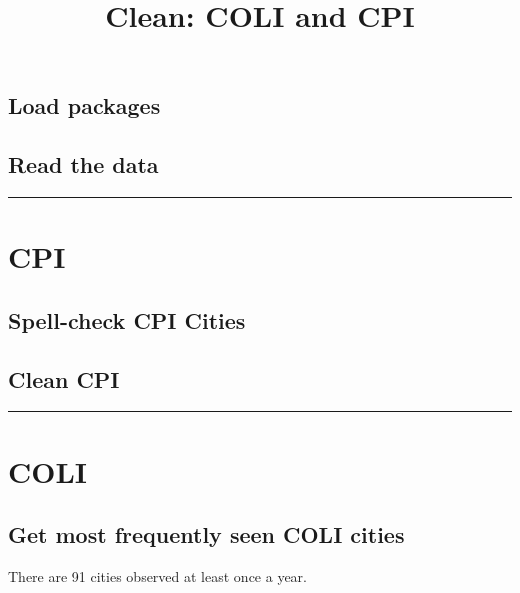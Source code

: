 \documentclass[]{article}
\title{Clean: COLI and CPI}
\author{}
\date{}
\begin{document}
\maketitle

\hypertarget{load-packages}{%
\subsection{Load packages}\label{load-packages}}

\hypertarget{read-the-data}{%
\subsection{Read the data}\label{read-the-data}}

\begin{center}\rule{0.5\linewidth}{\linethickness}\end{center}

\hypertarget{cpi}{%
\section{CPI}\label{cpi}}

\hypertarget{spell-check-cpi-cities}{%
\subsection{Spell-check CPI Cities}\label{spell-check-cpi-cities}}

\hypertarget{clean-cpi}{%
\subsection{Clean CPI}\label{clean-cpi}}

\begin{center}\rule{0.5\linewidth}{\linethickness}\end{center}

\hypertarget{coli}{%
\section{COLI}\label{coli}}

\hypertarget{get-most-frequently-seen-coli-cities}{%
\subsection{Get most frequently seen COLI
cities}\label{get-most-frequently-seen-coli-cities}}

There are 91 cities observed at least once a year.
\end{document}
